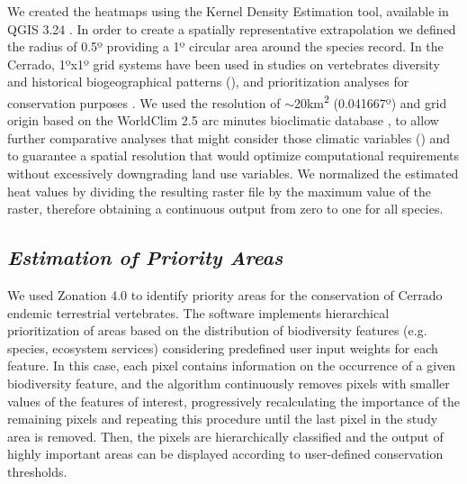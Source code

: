 \documentclass[12pt,openright,oneside,a4paper,english]{abntex2}
\begin{document}
We created the heatmaps using the Kernel Density Estimation tool, available in QGIS 3.24 \citep{QGIS}. In order to create a spatially representative extrapolation we defined the radius of 0.5º providing a 1º circular area around the species record. In the Cerrado, 1ºx1º grid systems have been used in studies on vertebrates diversity and historical biogeographical patterns (\citealp[e.g.][]{DinizFilho2008, Azevedo2016}), and prioritization analyses for conservation purposes \citep{DinizFilho2008b}. We used the resolution of $\sim$20km\textsuperscript{2} (0.041667º) and grid origin based on the WorldClim 2.5 arc minutes bioclimatic database \citep{FickHijmans2017}, to allow further comparative analyses that might consider those climatic variables (\citealp[see for example][]{Lemes2020}) and to guarantee a spatial resolution that would optimize computational requirements without excessively downgrading land use variables. We normalized the estimated heat values by dividing the resulting raster file by the maximum value of the raster, therefore obtaining a continuous output from zero to one for all species.

\subsection{\textit{Estimation of Priority Areas}}

We used Zonation 4.0 \citep{Moilanen2014} to identify priority areas for the conservation of Cerrado endemic terrestrial vertebrates. The software implements hierarchical prioritization of areas based on the distribution of biodiversity features (e.g. species, ecosystem services) considering predefined user input weights for each feature. In this case, each pixel contains information on the occurrence of a given biodiversity feature, and the algorithm continuously removes pixels with smaller values of the features of interest, progressively recalculating the importance of the remaining pixels and repeating this procedure until the last pixel in the study area is removed. Then, the pixels are hierarchically classified and the output of highly important areas can be displayed according to user-defined conservation thresholds.
\end{document}
